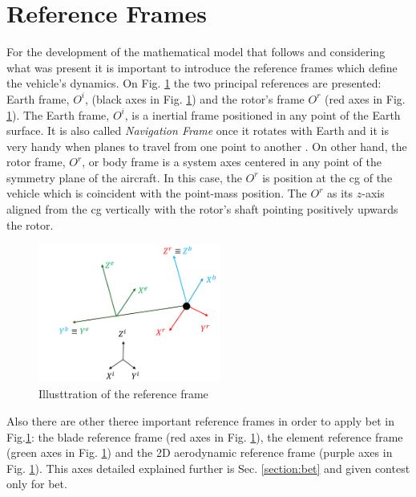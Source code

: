\section{Reference Frames}

For the development of the mathematical model that follows and considering what was present it is important to introduce the reference frames which define the vehicle’s dynamics. On Fig. \ref{fig:reference_frames} the two principal references are presented: Earth frame, $O^i$, (black axes in Fig. \ref{fig:reference_frames}) and the rotor’s frame $O^r$ (red axes in Fig. \ref{fig:reference_frames}). The Earth frame, $O^i$, is a inertial frame positioned in any point of the Earth surface. It is also called  \textit{Navigation Frame} once it rotates with Earth and it is very handy when planes to travel from one point to another \cite{soler_fundamentals_2014}. On other hand, the rotor frame, $O^r$, or body frame \cite{soler_fundamentals_2014} is a system axes centered in any point of the symmetry plane of the aircraft. In this case, the $O^r$ is position at the \gls{cg} of the vehicle which is coincident with the point-mass position. The $O^r$ as its $z$-axis aligned from the \gls{cg} vertically with the rotor's shaft pointing positively upwards the rotor.

\begin{figure}[!htb]
    \centering
    \includegraphics[width=6cm]{Figures/background/reference_frames.png}
    \caption{Illusttration of the reference frame}
    \label{fig:reference_frames}
\end{figure}

Also there are other theree important reference frames in order to apply \gls{bet} in Fig.\ref{fig:reference_frames}: the blade reference frame (red axes in Fig. \ref{fig:reference_frames}), the element reference frame (green axes in Fig. \ref{fig:reference_frames}) and the 2D aerodynamic reference frame (purple axes in Fig. \ref{fig:reference_frames}). This axes detailed explained further is Sec. \ref{section:bet} and given contest only for \gls{bet}.

